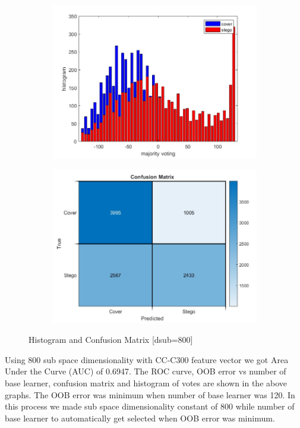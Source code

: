\begin{figure}[H]
    \begin{subfigure}[b]{0.5\textwidth}
        \includegraphics[width=\textwidth]{img/800/histogramgray.jpg}
    \end{subfigure}
    \hfill
    \begin{subfigure}[b]{0.5\textwidth}
        \includegraphics[width=\textwidth]{img/800/confusegray.jpg}
    \end{subfigure}
    \caption{Histogram and Confusion Matrix [dsub=800]}
\end{figure}
Using 800 sub space dimensionality with CC-C300 feature vector we got Area Under the Curve (AUC) of 0.6947. The ROC curve, OOB error vs number of base learner, confusion matrix and histogram of votes are shown in the above graphs. The OOB error was minimum when number of base learner was 120. In this process we made sub space dimensionality constant of 800 while number of base learner to automatically get selected when OOB error was minimum.

